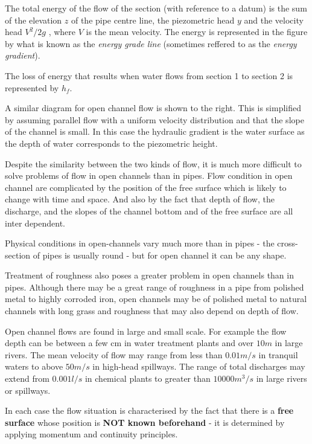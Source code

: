 \documentclass[a4paper, 12pt, british]{article} %
\numberwithin{equation}{section}
\numberwithin{figure}{section}
\numberwithin{table}{section}
\begin{document}
The total energy of the flow of the section (with reference to a datum) is the sum of the elevation $z$ of the pipe centre line, the piezometric head $y$ and the velocity head $V^2/2g$ , where $V$ is the mean velocity. The energy is represented in the figure by what is known as the \textit{energy grade line} (sometimes reffered to as the \textit{energy gradient}).

The loss of energy that results when water flows from section 1 to section 2 is represented by $h_f$.

A similar diagram for open channel flow is shown to the right. This is simplified by assuming parallel flow with a uniform velocity distribution and that the slope of the channel is small. In this case the hydraulic gradient is the water surface as the depth of water corresponds to the piezometric height.

Despite the similarity between the two kinds of flow, it is much more difficult to solve problems of flow in open channels than in pipes. Flow condition in open channel are complicated by the position of the free surface which is likely to change with time and space. And also by the fact that depth of flow, the discharge, and the slopes of the channel bottom and of the free surface are all inter dependent.

Physical conditions in open-channels vary much more than in pipes - the cross-section of pipes is usually round - but for open channel it can be any shape.

Treatment of roughness also poses a greater problem in open channels than in pipes. Although there may be a great range of roughness in a pipe from polished metal to highly corroded iron, open channels may be of polished metal to natural channels with long grass and roughness that may also depend on depth of flow.

Open channel flows are found in large and small scale. For example the flow depth can be between a few cm in water treatment plants and over $10m$ in large rivers. The mean velocity of flow may range from less than $0.01 m/s$ in tranquil waters to above $50 m/s$ in high-head spillways. The range of total discharges may extend from $0.001 l/s$ in chemical plants to greater than $10000 m^3/s$ in large rivers or spillways. 

In each case the flow situation is characterised by the fact that there is a \textbf{free surface} whose position is \textbf{NOT known beforehand} - it is determined by applying momentum and continuity principles.
\end{document}
